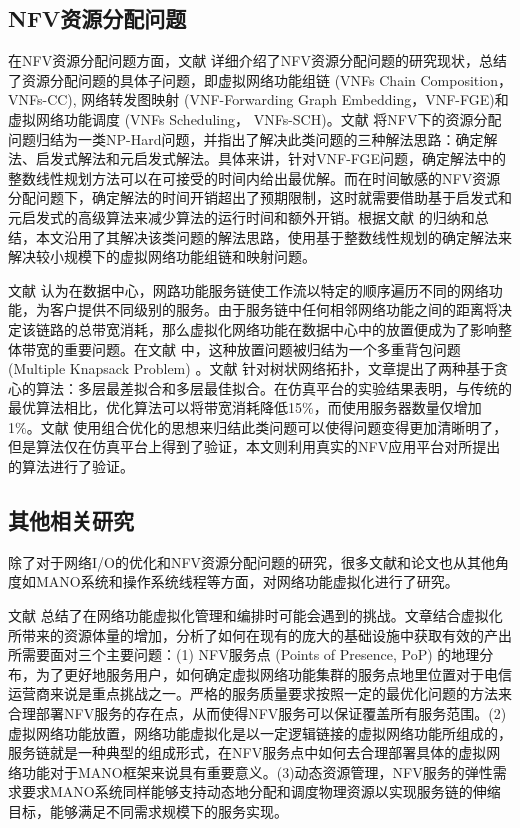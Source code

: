 \subsection{NFV资源分配问题}
在NFV资源分配问题方面，文献  详细介绍了NFV资源分配问题的研究现状，总结了资源分配问题的具体子问题，即虚拟网络功能组链 (VNFs Chain Composition，VNFs-CC), 网络转发图映射 (VNF-Forwarding Graph Embedding，VNF-FGE)和虚拟网络功能调度 (VNFs Scheduling， VNFs-SCH)。文献  将NFV下的资源分配问题归结为一类NP-Hard问题，并指出了解决此类问题的三种解法思路：确定解法、启发式解法和元启发式解法。具体来讲，针对VNF-FGE问题，确定解法中的整数线性规划方法可以在可接受的时间内给出最优解。而在时间敏感的NFV资源分配问题下，确定解法的时间开销超出了预期限制，这时就需要借助基于启发式和元启发式的高级算法来减少算法的运行时间和额外开销。根据文献  的归纳和总结，本文沿用了其解决该类问题的解法思路，使用基于整数线性规划的确定解法来解决较小规模下的虚拟网络功能组链和映射问题。

文献  认为在数据中心，网路功能服务链使工作流以特定的顺序遍历不同的网络功能，为客户提供不同级别的服务。由于服务链中任何相邻网络功能之间的距离将决定该链路的总带宽消耗，那么虚拟化网络功能在数据中心中的放置便成为了影响整体带宽的重要问题。在文献  中，这种放置问题被归结为一个多重背包问题 (Multiple Knapsack Problem) 。文献  针对树状网络拓扑，文章提出了两种基于贪心的算法：多层最差拟合和多层最佳拟合。在仿真平台的实验结果表明，与传统的最优算法相比，优化算法可以将带宽消耗降低15\%，而使用服务器数量仅增加1\%。文献  使用组合优化的思想来归结此类问题可以使得问题变得更加清晰明了，但是算法仅在仿真平台上得到了验证，本文则利用真实的NFV应用平台对所提出的算法进行了验证。


\subsection{其他相关研究}
除了对于网络I/O的优化和NFV资源分配问题的研究，很多文献和论文也从其他角度如MANO系统和操作系统线程等方面，对网络功能虚拟化进行了研究。

文献  总结了在网络功能虚拟化管理和编排时可能会遇到的挑战。文章结合虚拟化所带来的资源体量的增加，分析了如何在现有的庞大的基础设施中获取有效的产出所需要面对三个主要问题：(1) NFV服务点 (Points of Presence, PoP) 的地理分布，为了更好地服务用户，如何确定虚拟网络功能集群的服务点地里位置对于电信运营商来说是重点挑战之一。严格的服务质量要求按照一定的最优化问题的方法来合理部署NFV服务的存在点，从而使得NFV服务可以保证覆盖所有服务范围。(2)虚拟网络功能放置，网络功能虚拟化是以一定逻辑链接的虚拟网络功能所组成的，服务链就是一种典型的组成形式，在NFV服务点中如何去合理部署具体的虚拟网络功能对于MANO框架来说具有重要意义。(3)动态资源管理，NFV服务的弹性需求要求MANO系统同样能够支持动态地分配和调度物理资源以实现服务链的伸缩目标，能够满足不同需求规模下的服务实现。

